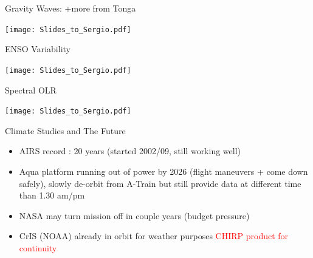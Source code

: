 \documentclass[10pt,t]{beamer}
\begin{document}
\begin{frame}{Gravity Waves: +more from Tonga}
\vspace{-0.35in}
\begin{center}
\texttt{[image: Slides\_to\_Sergio.pdf]}
\end{center}
\end{frame}
\begin{frame}{ENSO Variability}
\vspace{-0.35in}
\begin{center}
\texttt{[image: Slides\_to\_Sergio.pdf]}
\end{center}
\end{frame}
\begin{frame}{Spectral OLR}
\vspace{-0.35in}
\begin{center}
\texttt{[image: Slides\_to\_Sergio.pdf]}
\end{center}
\end{frame}
\begin{frame}{Climate Studies and The Future}
\begin{itemize}
  \item AIRS record : 20 years (started 2002/09, still working well)  
  \item Aqua platform running out of power by 2026 (flight maneuvers + come down safely), slowly de-orbit from A-Train
        but still provide data at different time than 1.30 am/pm
  \item NASA may turn mission off in couple years (budget pressure)
  \item CrIS (NOAA) already in orbit for weather purposes \textcolor{red}{CHIRP product for continuity}
\end{itemize}
\end{frame}
\end{document}
